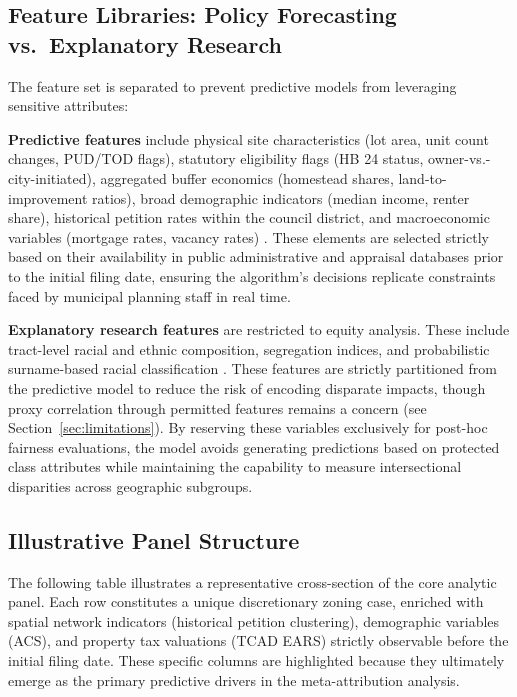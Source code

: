 \documentclass[twoside,11pt]{article}
\begin{document}
\subsection{Feature Libraries: Policy Forecasting vs.\ Explanatory Research}

The feature set is separated to prevent predictive models from leveraging sensitive attributes:

\textbf{Predictive features} include physical site characteristics (lot area, unit count changes, PUD/TOD flags), statutory eligibility flags (HB 24 status, owner-vs.-city-initiated), aggregated buffer economics (homestead shares, land-to-improvement ratios), broad demographic indicators (median income, renter share), historical petition rates within the council district, and macroeconomic variables (mortgage rates, vacancy rates) \cite{fredmacro}. These elements are selected strictly based on their availability in public administrative and appraisal databases prior to the initial filing date, ensuring the algorithm's decisions replicate constraints faced by municipal planning staff in real time.

\textbf{Explanatory research features} are restricted to equity analysis. These include tract-level racial and ethnic composition, segregation indices, and probabilistic surname-based racial classification \cite{sood2018ethnicolr}. These features are strictly partitioned from the predictive model to reduce the risk of encoding disparate impacts, though proxy correlation through permitted features remains a concern (see Section~\ref{sec:limitations}). By reserving these variables exclusively for post-hoc fairness evaluations, the model avoids generating predictions based on protected class attributes while maintaining the capability to measure intersectional disparities across geographic subgroups.

\subsection{Illustrative Panel Structure}
\label{sec:panel}

\noindent The following table illustrates a representative cross-section of the core analytic panel. Each row constitutes a unique discretionary zoning case, enriched with spatial network indicators (historical petition clustering), demographic variables (ACS), and property tax valuations (TCAD EARS) strictly observable before the initial filing date. These specific columns are highlighted because they ultimately emerge as the primary predictive drivers in the meta-attribution analysis.
\end{document}
